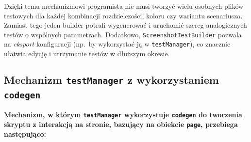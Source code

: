 \documentclass[12pt]{report}
\begin{document}
Dzięki temu mechanizmowi programista nie musi tworzyć wielu osobnych plików testowych dla każdej kombinacji rozdzielczości, koloru czy wariantu scenariusza. Zamiast tego jeden builder potrafi wygenerować i uruchomić szereg analogicznych testów o wspólnych parametrach. Dodatkowo, \texttt{ScreenshotTestBuilder} pozwala na \emph{eksport} konfiguracji (np.~by wykorzystać ją w \texttt{testManager}), co znacznie ułatwia edycję i utrzymanie testów w dłuższym okresie.

\subsection{Mechanizm \texttt{testManager} z wykorzystaniem \texttt{codegen}}
\label{sec:mechanizm-testManager}

\textbf{Mechanizm, w którym \texttt{testManager} wykorzystuje \texttt{codegen} do tworzenia skryptu z interakcją na stronie, bazujący na obiekcie \texttt{page}, przebiega następująco:}
\end{document}
